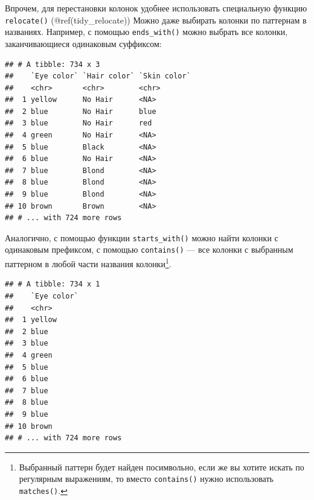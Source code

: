\documentclass[
]{book}
\newenvironment{Shaded}{\begin{snugshade}}{\end{snugshade}}
\newcommand{\KeywordTok}[1]{\textcolor[rgb]{0.13,0.29,0.53}{\textbf{#1}}}
\newcommand{\NormalTok}[1]{#1}
\newcommand{\OperatorTok}[1]{\textcolor[rgb]{0.81,0.36,0.00}{\textbf{#1}}}
\newcommand{\StringTok}[1]{\textcolor[rgb]{0.31,0.60,0.02}{#1}}
\begin{document}
Впрочем, для перестановки колонок удобнее использовать специальную функцию \texttt{relocate()} (@ref(tidy\_relocate))
Можно даже выбирать колонки по паттернам в названиях. Например, с помощью \texttt{ends\_with()} можно выбрать все колонки, заканчивающиеся одинаковым суффиксом:

\begin{Shaded}
\end{Shaded}

\begin{verbatim}
## # A tibble: 734 x 3
##    `Eye color` `Hair color` `Skin color`
##    <chr>       <chr>        <chr>       
##  1 yellow      No Hair      <NA>        
##  2 blue        No Hair      blue        
##  3 blue        No Hair      red         
##  4 green       No Hair      <NA>        
##  5 blue        Black        <NA>        
##  6 blue        No Hair      <NA>        
##  7 blue        Blond        <NA>        
##  8 blue        Blond        <NA>        
##  9 blue        Blond        <NA>        
## 10 brown       Brown        <NA>        
## # ... with 724 more rows
\end{verbatim}

Аналогично, с помощью функции \texttt{starts\_with()} можно найти колонки с одинаковым префиксом, с помощью \texttt{contains()} --- все колонки с выбранным паттерном в любой части названия колонки\footnote{Выбранный паттерн будет найден посимвольно, если же вы хотите искать по регулярным выражениям, то вместо \texttt{contains()} нужно использовать \texttt{matches()}.}.

\begin{Shaded}
\end{Shaded}

\begin{verbatim}
## # A tibble: 734 x 1
##    `Eye color`
##    <chr>      
##  1 yellow     
##  2 blue       
##  3 blue       
##  4 green      
##  5 blue       
##  6 blue       
##  7 blue       
##  8 blue       
##  9 blue       
## 10 brown      
## # ... with 724 more rows
\end{verbatim}
\end{document}
